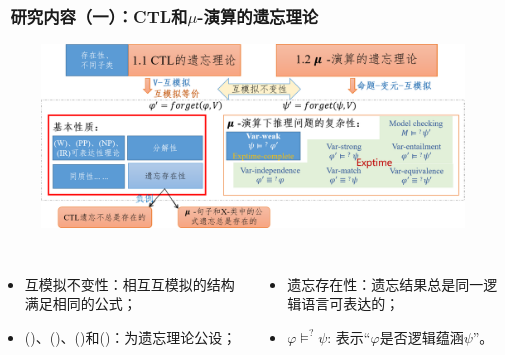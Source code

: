 \documentclass[aspectratio=1610, 9pt, CJK]{beamer}
\begin{document}
\begin{frame}  
	\frametitle{~研究内容（一）：CTL和$\mu$-演算的遗忘理论}
	\begin{figure}
		\includegraphics[scale=0.45]{figures/ctlMuForgFrame2}
	\end{figure}
	{\tiny 
		\begin{columns}
			\begin{itemize} 
				\item 互模拟不变性：相互互模拟的结构满足相同的公式；
				\item (\W)、(\PP)、(\NgP)和(\IR)：为遗忘理论公设；
			\end{itemize}
			\begin{itemize}
				\item 遗忘存在性：遗忘结果总是同一逻辑语言可表达的；
				\item $\varphi \models^? \psi$: 表示“$\varphi$是否逻辑蕴涵$\psi$”。
			\end{itemize}
		\end{columns}
	} 
\end{frame}
\end{document}
